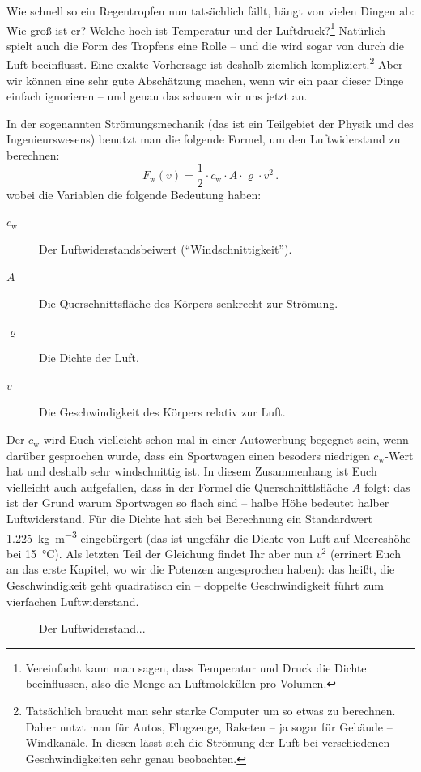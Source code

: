 Wie schnell so ein Regentropfen nun tatsächlich fällt, hängt von vielen Dingen ab: Wie groß ist er? Welche hoch ist Temperatur und der Luftdruck?\footnote{%
    Vereinfacht kann man sagen, dass Temperatur und Druck die Dichte beeinflussen, also die Menge an Luftmolekülen pro Volumen.}
Natürlich spielt auch die Form des Tropfens eine Rolle -- und die wird sogar von durch die Luft beeinflusst. Eine exakte Vorhersage ist deshalb ziemlich kompliziert.\footnote{%
    Tatsächlich braucht man sehr starke Computer um so etwas zu berechnen. Daher nutzt man für Autos, Flugzeuge, Raketen -- ja sogar für Gebäude -- Windkanäle. In diesen lässt sich die Strömung der Luft bei verschiedenen Geschwindigkeiten sehr genau beobachten.}
Aber wir können eine sehr gute Abschätzung machen, wenn wir ein paar dieser Dinge einfach ignorieren -- und genau das schauen wir uns jetzt an.

In der sogenannten Strömungsmechanik (das ist ein Teilgebiet der Physik und des Ingenieurswesens) benutzt man die folgende Formel, um den Luftwiderstand zu berechnen:
\begin{equation}
    F_\textrm{w}(v) = \frac12 \cdot c_\mathrm{w} \cdot A \cdot \varrho \cdot v^2 \,.
\end{equation}
wobei die Variablen die folgende Bedeutung haben:
\begin{description}
    \item[$c_\mathrm{w}$]Der Luftwiderstandsbeiwert (``Windschnittigkeit''). 
    \item[$A$] Die Querschnittsfläche des Körpers senkrecht zur Strömung. 
    \item[$\varrho$] Die Dichte der Luft. 
    \item[$v$] Die Geschwindigkeit des Körpers relativ zur Luft. 
\end{description}
Der $c_\mathrm{w}$ wird Euch vielleicht schon mal in einer Autowerbung begegnet sein, wenn darüber gesprochen wurde, dass ein Sportwagen einen besoders niedrigen $c_\mathrm{w}$-Wert hat und deshalb sehr windschnittig ist. In diesem Zusammenhang ist Euch vielleicht auch aufgefallen, dass in der Formel die Querschnittlsfläche $A$ folgt: das ist der Grund warum Sportwagen so flach sind -- halbe Höhe bedeutet halber Luftwiderstand. Für die Dichte hat sich bei Berechnung ein Standardwert \qty{1,225}{\kg\per\meter^3} eingebürgert (das ist ungefähr die Dichte von Luft auf Meereshöhe bei \qty{15}{\degreeCelsius}). Als letzten Teil der Gleichung findet Ihr aber nun $v^2$ (errinert Euch an das erste Kapitel, wo wir die Potenzen angesprochen haben): das heißt, die Geschwindigkeit geht quadratisch ein -- doppelte Geschwindigkeit führt zum vierfachen Luftwiderstand.
\begin{figure}[h]
    
    \caption{Der Luftwiderstand...}
    \label{fig:physik:bewegung:luftwiderstand}
\end{figure}



